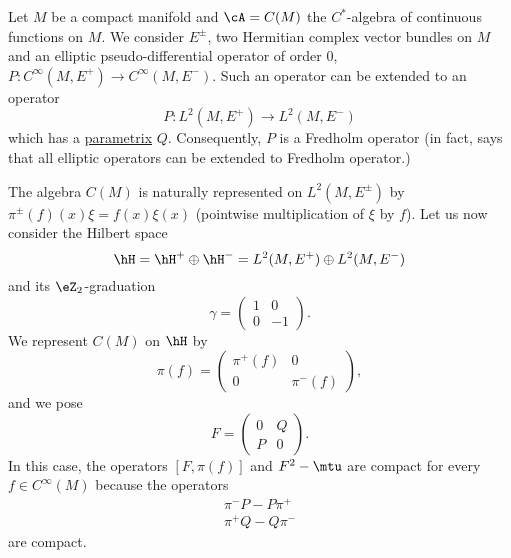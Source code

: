 Let $M$ be a compact manifold and $\cA=C(M)$ the $C^*$-algebra of continuous functions on $M$. We consider $E^{\pm}$, two Hermitian complex vector bundles on $M$ and an elliptic pseudo-differential operator of order $0$, $P\colon  C^{\infty}(M,E^+)\to  C^{\infty}(M,E^-)$. Such an operator can be extended to an operator
\begin{equation}
	P\colon L^2(M,E^+)\to L^2(M,E^-)
\end{equation}
which has a \hyperlink{DefParametrix}{parametrix} $Q$. Consequently, $P$ is a Fredholm operator (in fact,  says that all elliptic operators can be extended to Fredholm operator.)

The algebra $C(M)$ is naturally represented on $L^2(M,E^{\pm})$ by $\pi^{\pm}(f)(x)\xi=f(x)\xi(x)$ (pointwise multiplication of $\xi$ by $f$). Let us now consider the Hilbert space
\begin{equation}
	\hH=\hH^+\oplus\hH^-=L^2(M,E^{+})\oplus L^2(M,E^{-})
\end{equation}
and its $\eZ_2$-graduation
\begin{equation}
	\gamma=\begin{pmatrix}
		1	&	0	\\
		0	&	-1
	\end{pmatrix}.
\end{equation}
We represent $C(M)$ on $\hH$ by
\begin{equation}
	\pi(f)=\begin{pmatrix}
		\pi^+(f)	&	0	\\
		0	&	\pi^-(f)
	\end{pmatrix},
\end{equation}
and we pose
\begin{equation}
	F=\begin{pmatrix}
		0	&	Q	\\
		P	&	0
	\end{pmatrix}.
\end{equation}
In this case, the operators $[F,\pi(f)]$ and $F^2-\mtu$ are compact for every $f\in  C^{\infty}(M)$ because the operators
\begin{subequations}
	\begin{align}
		\pi^-P-P\pi^+\\
		\pi^+Q-Q\pi^-
	\end{align}
\end{subequations}
are compact.

